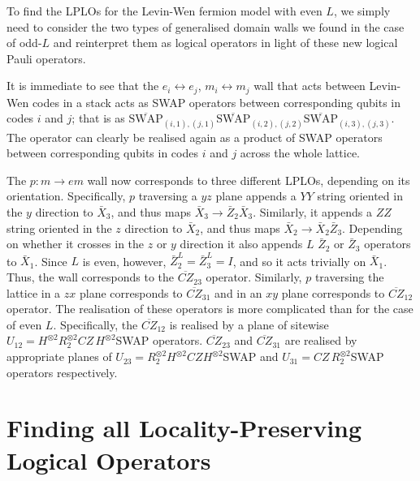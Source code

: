 \documentclass[pra,twocolumn,a4paper,nofootinbib]{revtex4-1}
\begin{document}
To find the LPLOs for the Levin-Wen fermion model with even $L$, we simply need to consider the two types of generalised domain walls we found in the case of odd-$L$ and reinterpret them as logical operators in light of these new logical Pauli operators. 

It is immediate to see that the $e_i \leftrightarrow e_j$, $m_i \leftrightarrow m_j$ wall that acts between Levin-Wen codes in a stack acts as SWAP operators between corresponding qubits in codes $i$ and $j$; that is as $\overline{\text{SWAP}}_{(i,1),(j,1)} \overline{\text{SWAP}}_{(i,2),(j,2)}\overline{\text{SWAP}}_{(i,3),(j,3)}$. The operator can clearly be realised again as a product of SWAP operators between corresponding qubits in codes $i$ and $j$ across the whole lattice.

The $p: m \to em$ wall now corresponds to three different LPLOs, depending on its orientation. Specifically, $p$ traversing a $yz$ plane appends a $YY$ string oriented in the $y$ direction to $\bar{X}_3$, and thus maps $\bar{X}_3 \to \bar{Z}_2\bar{X}_3$. Similarly, it appends a $ZZ$ string oriented in the $z$ direction to $\bar{X}_2$, and thus maps $\bar{X}_2 \to \bar{X}_2\bar{Z}_3$. Depending on whether it crosses in the $z$ or $y$ direction it also appends $L$ $\bar{Z}_2$ or $\bar{Z}_3$ operators to $\bar{X}_1$. Since $L$ is even, however, $\bar{Z}_2^L=\bar{Z}_3^L=I$, and so it acts trivially on $\bar{X}_1$. Thus, the wall corresponds to the $\overline{CZ}_{23}$ operator. Similarly, $p$ traversing the lattice in a $zx$ plane corresponds to $\overline{CZ}_{31}$ and in an $xy$ plane corresponds to $\overline{CZ}_{12}$ operator. The realisation of these operators is more complicated than for the case of even $L$. Specifically, the $\overline{CZ}_{12}$ is realised by a plane of sitewise $U_{12} = H^{\otimes 2} R_2^{\otimes 2} CZ\, H^{\otimes 2}$SWAP operators. $\overline{CZ}_{23}$ and $\overline{CZ}_{31}$ are realised by appropriate planes of $U_{23}= R_2^{\otimes 2} H^{\otimes 2} CZ H^{\otimes 2}$SWAP and $U_{31}=CZ\,R_2^{\otimes 2}$SWAP operators respectively.

\section{Finding all Locality-Preserving Logical Operators}
\label{V}
\end{document}
